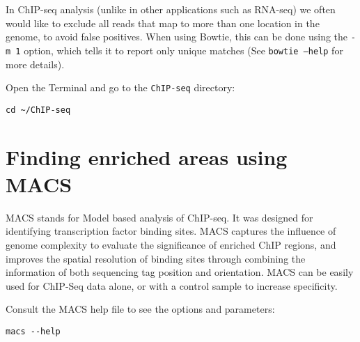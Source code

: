 \begin{note}
In ChIP-seq analysis (unlike in other applications such as RNA-seq) we often
would like to exclude all reads that map to more than one location in the
genome, to avoid false positives. When using Bowtie, this can be done using the
\texttt{-m 1} option, which tells it to report only unique matches (See
\texttt{bowtie --help} for more details).
\end{note}


\begin{steps}
Open the Terminal and go to the \texttt{ChIP-seq} directory:
\begin{lstlisting}
cd ~/ChIP-seq
\end{lstlisting}
\end{steps}

\section{Finding enriched areas using MACS}

\begin{information}
MACS stands for Model based analysis of ChIP-seq. It was designed for
identifying transcription factor binding sites. MACS captures the influence of
genome complexity to evaluate the significance of enriched ChIP regions, and
improves the spatial resolution of binding sites through combining the
information of both sequencing tag position and orientation. MACS can be easily
used for ChIP-Seq data alone, or with a control sample to increase specificity.
\end{information}

\begin{steps}
Consult the MACS help file to see the options and parameters:

\begin{lstlisting}
macs --help
\end{lstlisting}
\end{steps}

